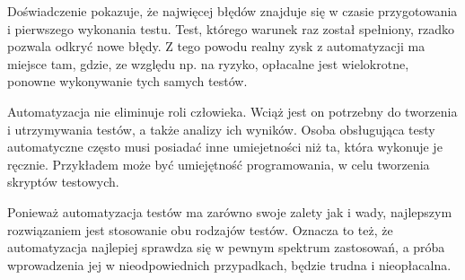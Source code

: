 \documentclass[00-praca-magisterska.tex]{subfiles}
\begin{document}
Doświadczenie pokazuje, że najwięcej błędów znajduje się w czasie przygotowania
i pierwszego wykonania testu. Test, którego warunek raz został spełniony,
rzadko pozwala odkryć nowe błędy. Z tego powodu realny zysk z automatyzacji ma
miejsce tam, gdzie, ze względu np. na ryzyko, opłacalne jest wielokrotne,
ponowne wykonywanie tych samych testów.

Automatyzacja nie eliminuje roli człowieka. Wciąż jest on potrzebny do
tworzenia i utrzymywania testów, a także analizy ich wyników. Osoba obsługująca
testy automatyczne często musi posiadać inne umiejetności niż ta, która
wykonuje je ręcznie. Przykładem może być umiejętność programowania, w celu
tworzenia skryptów testowych.

Ponieważ automatyzacja testów ma zarówno swoje zalety jak i wady, najlepszym
rozwiązaniem jest stosowanie obu rodzajów testów. Oznacza to też, że
automatyzacja najlepiej sprawdza się w pewnym spektrum zastosowań, a próba
wprowadzenia jej w nieodpowiednich przypadkach, będzie trudna i nieopłacalna.
\end{document}
